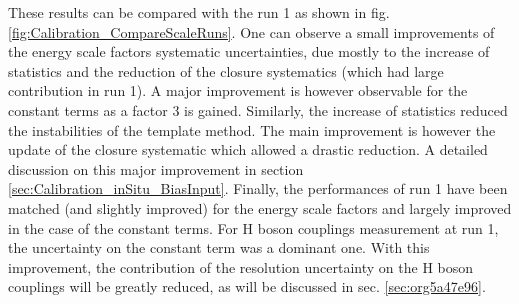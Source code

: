 These results can be compared with the run 1 as shown in fig. \ref{fig:Calibration_CompareScaleRuns}.
One can observe a small improvements of the energy scale factors systematic uncertainties, due mostly to the increase of statistics and the reduction of the closure systematics (which had large contribution in run 1).
A major improvement is however observable for the constant terms as a factor 3 is gained.
Similarly, the increase of statistics reduced the instabilities of the template method.
The main improvement is however the update of the closure systematic which allowed a drastic reduction.
A detailed discussion on this major improvement in section \ref{sec:Calibration_inSitu_BiasInput}.
Finally, the performances of run 1 have been matched (and slightly improved) for the energy scale factors and largely improved in the case of the constant terms.
For H boson couplings measurement at run 1, the uncertainty on the constant term was a dominant one.
With this improvement, the contribution of the resolution uncertainty on the H boson couplings will be greatly reduced, as will be discussed in sec. \ref{sec:org5a47e96}.

